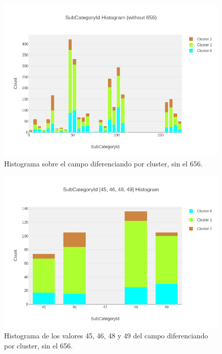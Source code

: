 \begin{figure}[!th]
\includegraphics[scale=0.5]{figures/histogram-subcategoryid-per-cluster-without656}
\centering
\caption{Histograma sobre el campo  diferenciando por cluster, sin el  656.}
\label{fig:histogram-subcategoryid-per-cluster-without656}
\end{figure}

\begin{figure}[!th]
\includegraphics[scale=0.5]{figures/histogram-subcategoryid-45-49}
\centering
\caption{Histograma de los valores 45, 46, 48 y 49 del campo  diferenciando por cluster, sin el  656.}
\label{fig:histogram-subcategoryid-45-49}
\end{figure}













\newpage
































